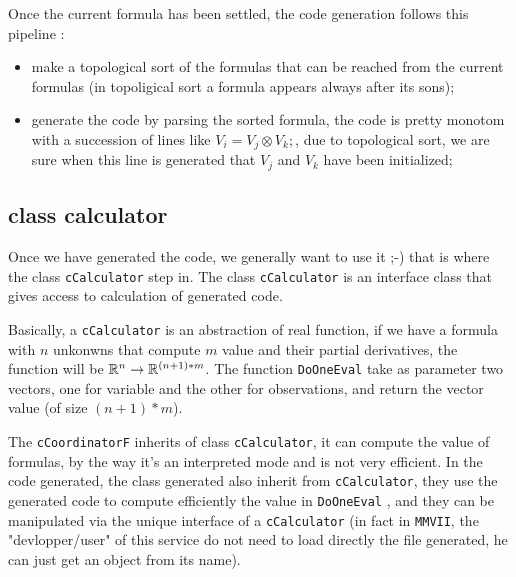 Once the current formula has been settled, the code generation follows this pipeline :

\begin{itemize}
     \item make a topological sort of the formulas that can be reached from the current formulas
         (in topoligical sort a formula appears always after its sons);

     \item generate the code by parsing the sorted formula, the code is pretty monotom with 
           a succession of lines like $V_i = V_j \otimes V_k; $, due to topological sort, we are
           sure when this line is generated that $V_j$ and $V_k$ have been initialized;
\end{itemize}



\subsection{class calculator}

Once we have generated the code, we generally want to use it ;-)  that is where 
the class {\tt cCalculator} step in.  The class {\tt cCalculator} is an interface
class that gives access to calculation of generated code.

Basically,  a {\tt cCalculator} is an abstraction of real function,
if we have a formula with $n$ unkonwns that compute $m$ value and their partial derivatives,
the function will be $\mathbb{R}^n \rightarrow \mathbb{R}^{(n+1)*m}$. 
The function {\tt DoOneEval} take as parameter two vectors, one for variable and the other
for observations, and return the vector value (of size $(n+1)*m$).

The {\tt cCoordinatorF} inherits of class {\tt cCalculator}, it can  compute the
value of formulas, by the way it's an interpreted mode and is not very efficient.
In the code generated, the class generated also inherit from {\tt cCalculator},  they
use the generated code to compute efficiently the value in {\tt DoOneEval} ,
and they can be manipulated via the unique interface of a {\tt cCalculator}
(in fact in {\tt MMVII}, the "devlopper/user" of this service do not need to load
directly the file generated, he can just get an object from its name).


